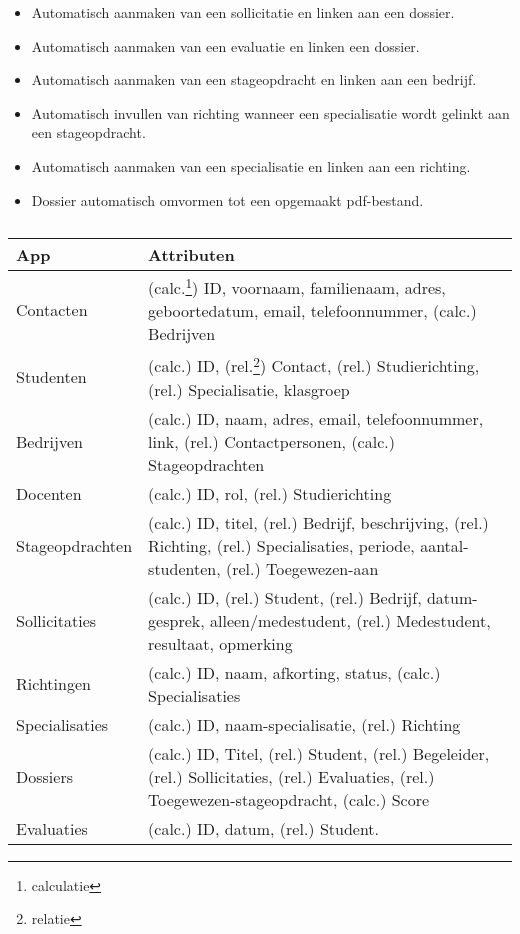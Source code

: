 \begin{itemize}
    \item Automatisch aanmaken van een sollicitatie en linken aan een dossier.
    \item Automatisch aanmaken van een evaluatie en linken een dossier.
    \item Automatisch aanmaken van een stageopdracht en linken aan een bedrijf.
    \item Automatisch invullen van richting wanneer een specialisatie wordt gelinkt aan een stageopdracht.
    \item Automatisch aanmaken van een specialisatie en linken aan een richting.
    \item Dossier automatisch omvormen tot een opgemaakt pdf-bestand.
\end{itemize}

\begin{table}
    \centering
    \caption{\label{tab:Resultaat analyse} }
    \begin{tabular}{ | l{4cm} | l{8cm} | }
        \hline
        \textbf{App} & \textbf{Attributen} \\
        \hline\hline
        Contacten       & (calc.\footnote{calculatie}) ID, voornaam, familienaam, adres, geboortedatum, email, telefoonnummer, (calc.) Bedrijven \\
        Studenten       & (calc.) ID, (rel.\footnote{relatie}) Contact, (rel.) Studierichting, (rel.)  Specialisatie, klasgroep \\
        Bedrijven       & (calc.) ID, naam, adres, email, telefoonnummer, link, (rel.) Contactpersonen, (calc.) Stageopdrachten \\
        Docenten        & (calc.) ID, rol, (rel.) Studierichting \\
        Stageopdrachten & (calc.) ID, titel, (rel.) Bedrijf, beschrijving, (rel.) Richting, (rel.) Specialisaties, periode, aantal-studenten, (rel.) Toegewezen-aan \\
        Sollicitaties   & (calc.) ID, (rel.) Student, (rel.) Bedrijf, datum-gesprek, alleen/medestudent, (rel.) Medestudent, resultaat, opmerking \\
        Richtingen      & (calc.) ID, naam, afkorting, status, (calc.) Specialisaties \\
        Specialisaties  & (calc.) ID, naam-specialisatie, (rel.) Richting \\
        Dossiers        & (calc.) ID, Titel, (rel.) Student, (rel.) Begeleider, (rel.) Sollicitaties, (rel.) Evaluaties, (rel.) Toegewezen-stageopdracht, (calc.) Score \\
        Evaluaties      & (calc.) ID, datum, (rel.) Student. \\
        \hline
    \end{tabular}
\end{table}

